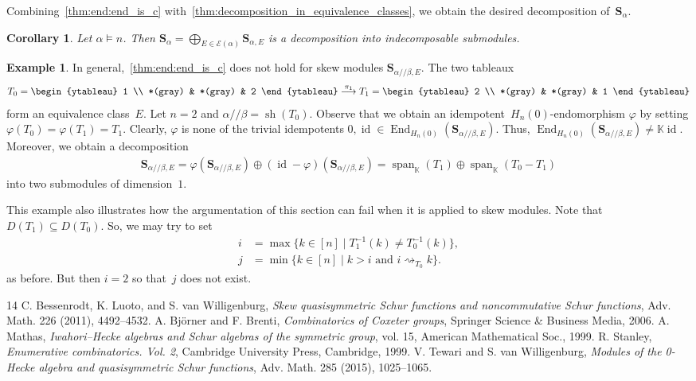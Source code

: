 \documentclass[10pt]{amsart}
\theoremstyle{plain}
\theoremstyle{plain}
\theoremstyle{plain}
\theoremstyle{plain}
\theoremstyle{plain}
\newtheorem{coro}[coro]{Corollary}
\theoremstyle{definition}
\theoremstyle{definition}
\newtheorem{exam}[exam]{Example}
\newcommand{\bs}[1]{\boldsymbol{#1} }
\newcommand{\mc}[1]{\mathcal{#1} }
\newcommand{\K}{\mathbb K}
\DeclareMathOperator{\id}{id}
\DeclareMathOperator{\sh}{sh}
\DeclareMathOperator{\End}{End}
\newcommand{\spa}{\operatorname{span}}
\newcommand{\He}{H_n(0)}
\newcommand{\ab}{{\alpha / \! \! / \beta}}
\newcommand{\att}{\rightsquigarrow}
\newcommand{\sa}{\bs S_{\alpha}}
\newcommand{\se}{\bs S_{\alpha,E}}
\newcommand{\sse}{\bs S_{\ab,E}}
\begin{document}
Combining~\cref{thm:end:end_is_c} with~\cref{thm:decomposition_in_equivalence_classes}, we obtain the desired decomposition of~$\sa$.

\begin{coro}
	Let $\alpha \vDash n$. Then $\sa = \bigoplus_{E\in \mc E(\alpha)} \se$ is a decomposition into indecomposable submodules.
\end{coro}

\begin{exam}
	\label{exa:decomposable_module}
	 In general,~\cref{thm:end:end_is_c} does not hold for skew modules $\sse$.
	The two tableaux
	\begin{align*}
	T_0 =
	\begin{ytableau}
	1 \\
	*(gray) & *(gray) & 2
	\end{ytableau}
	\overset{\pi_1}{\longrightarrow}
	T_1 = 
	\begin{ytableau}
	2 \\
	*(gray) & *(gray) & 1
	\end{ytableau}
	\end{align*}
	form an equivalence class~$E$. Let $n=2$ and $\ab=\sh(T_0)$. 
	Observe that we obtain an idempotent~$\He$-endomorphism $\varphi$ by setting $\varphi(T_0) = \varphi(T_1) = T_1$.
	 Clearly, $\varphi$ is none of the trivial idempotents $0,\id\in \End_{\He}(\sse)$. Thus, $\End_{\He}(\sse)\neq \K\id$. Moreover, we obtain a decomposition
	\begin{align*}
	\sse = \varphi(\sse) \oplus (\id -\varphi) (\sse) = \spa_\K(T_1) \oplus \spa_\K(T_0-T_1)
	\end{align*} 
	into two submodules of dimension~$1$.
	
	This example also illustrates how the argumentation of this section can fail when it is applied to skew modules. Note that $D(T_1) \subseteq D(T_0)$. So, we may try to set
	 \begin{align*}
		i &= \max \big\{ k \in [n] \mid T_1^{-1}(k) \neq T^{-1}_0(k) \big\}, \\
		j &= \min \big\{k \in [n] \mid k>i \text{ and } i\att_{T_0} k \big\}.
	\end{align*}
	as before.
	But then $i=2$ so that~$j$ does not exist. 
\end{exam}
\begin{thebibliography}{14}
 C. Bessenrodt, K. Luoto, and S. van Willigenburg, \emph{Skew quasisymmetric Schur functions and noncommutative Schur functions}, Adv. Math. 226 (2011), 4492--4532.
 A. Bj\"orner and F. Brenti, \emph{Combinatorics of Coxeter groups}, Springer Science \& Business Media, 2006.
 A. Mathas, \emph{Iwahori--Hecke algebras and Schur algebras of the symmetric group}, vol. 15, American Mathematical Soc., 1999.
 R. Stanley, \emph{Enumerative combinatorics. Vol. 2}, Cambridge University Press, Cambridge, 1999.
 V. Tewari and S. van Willigenburg, \emph{Modules of the 0-Hecke algebra and quasisymmetric Schur functions}, Adv. Math. 285 (2015), 1025--1065.
\end{thebibliography}
\end{document}
